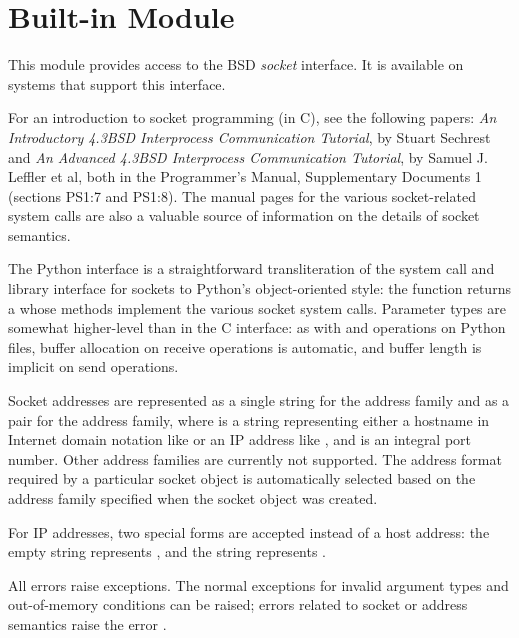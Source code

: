 \section{Built-in Module }
\label{module-socket}

This module provides access to the BSD \emph{socket} interface.
It is available on \UNIX{} systems that support this interface.

For an introduction to socket programming (in C), see the following
papers: \emph{An Introductory 4.3BSD Interprocess Communication
Tutorial}, by Stuart Sechrest and \emph{An Advanced 4.3BSD Interprocess
Communication Tutorial}, by Samuel J.  Leffler et al, both in the
\UNIX{} Programmer's Manual, Supplementary Documents 1 (sections PS1:7
and PS1:8).  The \UNIX{} manual pages for the various socket-related
system calls are also a valuable source of information on the details of
socket semantics.

The Python interface is a straightforward transliteration of the
\UNIX{} system call and library interface for sockets to Python's
object-oriented style: the  function returns a
 whose methods implement the various socket system
calls.  Parameter types are somewhat higher-level than in the C
interface: as with  and  operations on Python
files, buffer allocation on receive operations is automatic, and
buffer length is implicit on send operations.

Socket addresses are represented as a single string for the
 address family and as a pair
 for the  address family,
where  is a string representing
either a hostname in Internet domain notation like
 or an IP address like ,
and  is an integral port number.  Other address families are
currently not supported.  The address format required by a particular
socket object is automatically selected based on the address family
specified when the socket object was created.

For IP addresses, two special forms are accepted instead of a host
address: the empty string represents , and the string
 represents .

All errors raise exceptions.  The normal exceptions for invalid
argument types and out-of-memory conditions can be raised; errors
related to socket or address semantics raise the error .

